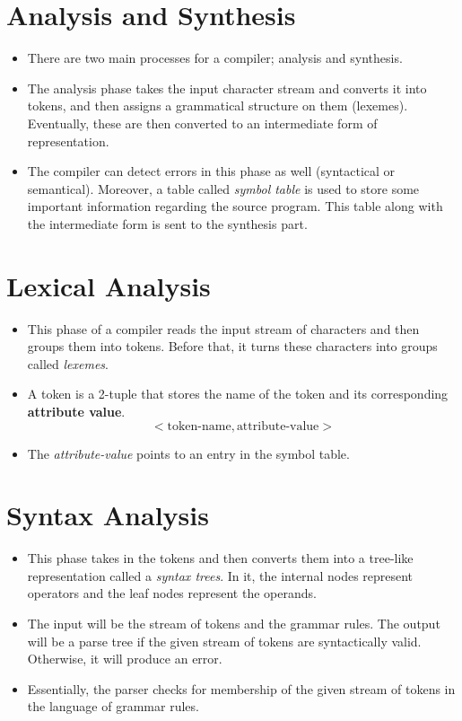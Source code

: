 \documentclass[hidelinks]{article}
\begin{document}
\section{Analysis and Synthesis}
    \begin{itemize}
        \item There are two main processes for a compiler; analysis and synthesis. 
        \item The analysis phase takes the input character stream and converts it into tokens, and then assigns a grammatical structure on them (lexemes). Eventually, these are then converted to an intermediate form of representation.
        \item The compiler can detect errors in this phase as well (syntactical or semantical). Moreover, a table called \textit{symbol table} is used to store some important information regarding the source program. This table along with the intermediate form is sent to the synthesis part.
    \end{itemize}

\section{Lexical Analysis}
    \begin{itemize}
        \item This phase of a compiler reads the input stream of characters and then groups them into tokens. Before that, it turns these characters into groups called \textit{lexemes}.
        \item A token is a 2-tuple that stores the name of the token and its corresponding \textbf{attribute value}.
        $$<\text{token-name}, \text{attribute-value}>$$
        \item The \textit{attribute-value} points to an entry in the symbol table.
    \end{itemize}

\section{Syntax Analysis}
    \begin{itemize}
        \item This phase takes in the tokens and then converts them into a tree-like representation called a \textit{syntax trees}. In it, the internal nodes represent operators and the leaf nodes represent the operands.
        \item The input will be the stream of tokens and the grammar rules. The output will be a parse tree if the given stream of tokens are syntactically valid. Otherwise, it will produce an error.
        \item Essentially, the parser checks for membership of the given stream of tokens in the language of grammar rules.
    \end{itemize}
\end{document}
